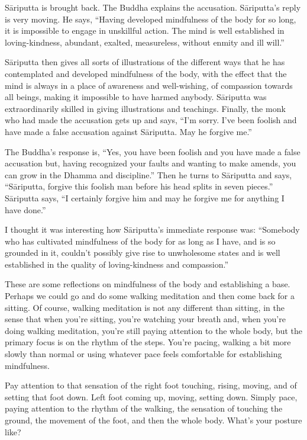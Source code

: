 Sāriputta is brought back. The Buddha explains the accusation.
Sāriputta’s reply is very moving. He says, “Having developed mindfulness
of the body for so long, it is impossible to engage in unskillful
action. The mind is well established in loving-kindness, abundant,
exalted, measureless, without enmity and ill will.”

Sāriputta then gives all sorts of illustrations of the different ways
that he has contemplated and developed mindfulness of the body, with the
effect that the mind is always in a place of awareness and well-wishing,
of compassion towards all beings, making it impossible to have harmed
anybody. Sāriputta was extraordinarily skilled in giving illustrations
and teachings. Finally, the monk who had made the accusation gets up and
says, “I’m sorry. I’ve been foolish and have made a false accusation
against Sāriputta. May he forgive me.”

The Buddha’s response is, “Yes, you have been foolish and you have made
a false accusation but, having recognized your faults and wanting to
make amends, you can grow in the Dhamma and discipline.” Then he turns
to Sāriputta and says, “Sāriputta, forgive this foolish man before his
head splits in seven pieces.” Sāriputta says, “I certainly forgive him
and may he forgive me for anything I have done.”

I thought it was interesting how Sāriputta’s immediate response was:
“Somebody who has cultivated mindfulness of the body for as long as I
have, and is so grounded in it, couldn’t possibly give rise to
unwholesome states and is well established in the quality of
loving-kindness and compassion.”

These are some reflections on mindfulness of the body and establishing a
base. Perhaps we could go and do some walking meditation and then come
back for a sitting. Of course, walking meditation is not any different
than sitting, in the sense that when you’re sitting, you’re watching
your breath and, when you’re doing walking meditation, you’re still
paying attention to the whole body, but the primary focus is on the
rhythm of the steps. You’re pacing, walking a bit more slowly than
normal or using whatever pace feels comfortable for establishing
mindfulness.

Pay attention to that sensation of the right foot touching, rising,
moving, and of setting that foot down. Left foot coming up, moving,
setting down. Simply pace, paying attention to the rhythm of the
walking, the sensation of touching the ground, the movement of the foot,
and then the whole body. What’s your posture like?

